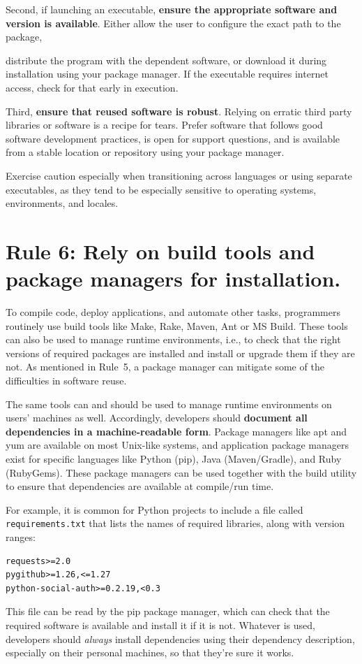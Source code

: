 \documentclass[10pt,letterpaper]{article}
\newcommand{\rulemajor}[1]{\section{#1}}
\newcommand{\ruleminor}[1]{\textbf{#1}}
\newcommand{\reviewed}[1]{{\color{black}#1}}
\begin{document}
Second, \reviewed{if launching an executable,}
\ruleminor{ensure the appropriate software and version is available}.
Either allow the user to
configure the exact path to the package, \reviewed{distribute the program with the
dependent software, or download it during installation using your
package manager. If the executable requires internet access, check for that
early in execution.

Third, \ruleminor{ensure that reused software is robust}. Relying on erratic third
party libraries or software is a recipe for tears. Prefer software that follows
good software development practices, is open for support questions, and is
available from a stable location or repository using your package manager.

Exercise caution especially when transitioning across languages or using
separate executables, as they tend to be especially sensitive to operating
systems, environments, and locales.}

\rulemajor{Rule 6: Rely on build tools and package managers for installation.}

\reviewed{To compile code, deploy applications, and automate other tasks,
programmers routinely use build tools like Make, Rake, Maven, Ant or MS Build.
These tools can also be used to manage runtime environments,
i.e.,
to check that the right versions of required packages are installed
and install or upgrade them if they are not.
As mentioned in Rule~5,
a package manager can mitigate some of the difficulties in software reuse.}

The same tools can and should be used to manage runtime environments on users' machines as well.
Accordingly,
developers should
\ruleminor{document all dependencies in a machine-readable form}.
Package managers like apt and yum are available on most Unix-like systems, and
application package managers exist for specific languages like Python (pip),
Java (Maven/Gradle), and Ruby (RubyGems). These package managers can be used
together with the build utility to ensure that dependencies are available at
compile/run time.

For example, it is common for Python projects to include a file called
\texttt{requirements.txt} that lists the names of required libraries,
along with version ranges:

\begin{verbatim}
requests>=2.0
pygithub>=1.26,<=1.27
python-social-auth>=0.2.19,<0.3
\end{verbatim}

This file can be read by the pip package manager, which can check that the
required software is available and install it if it is not.
Whatever is used,
developers should \emph{always} install dependencies
using their dependency description, especially on their personal machines, so that
they're sure it works.
\end{document}
